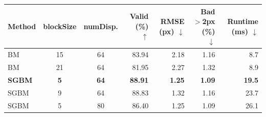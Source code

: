 \begin{tabular}{lccrrrr}
\toprule
Method & blockSize & numDisp. & Valid (\%) $\uparrow$ & RMSE (px) $\downarrow$ & Bad $>$2px (\%) $\downarrow$ & Runtime (ms) $\downarrow$ \\
\midrule
BM & 15 & 64 & 83.94 & 2.18 & 1.16 & 8.7 \\
BM & 21 & 64 & 81.95 & 2.27 & 1.32 & 8.9 \\
\textbf{SGBM} & \textbf{5} & \textbf{64} & \textbf{88.91} & \textbf{1.25} & \textbf{1.09} & \textbf{19.5} \\
SGBM & 9 & 64 & 88.83 & 1.32 & 1.16 & 23.7 \\
SGBM & 5 & 80 & 86.40 & 1.25 & 1.09 & 26.1 \\
\bottomrule
\end{tabular}
